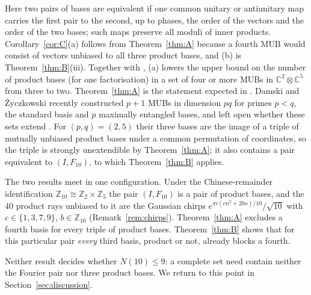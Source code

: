\documentclass[11pt]{article}
\theoremstyle{definition}
\theoremstyle{remark}
\newcommand{\C}{\mathbb{C}}
\newcommand{\Z}{\mathbb{Z}}
\begin{document}
Here two pairs of bases are equivalent if one common unitary or antiunitary map carries the first pair to the second,
up to phases, the order of the vectors and the order of the two bases; such maps preserve all moduli of inner
products. Corollary~\ref{cor:C}(a) follows from Theorem~\ref{thm:A} because a fourth MUB would consist of vectors
unbiased to all three product bases, and (b) is Theorem~\ref{thm:B}(iii). Together with \cite[Thm.~2]{MPW2016}, (a)
lowers the upper bound on the number of product bases (for one factorisation) in a set of four or more MUBs in
$\C^2\otimes\C^5$ from three to two. Theorem~\ref{thm:A} is the statement expected in
\cite[after Cor.~6]{MPW2016}. Damski and \.Zyczkowski recently constructed $p+1$ MUBs in dimension $pq$ for primes
$p<q$, the standard basis and $p$ maximally entangled bases, and left open whether these sets extend
\cite{DamskiZyczkowski2026}. For $(p,q)=(2,5)$ their three bases are the image of a triple of mutually unbiased
product bases under a common permutation of coordinates, so the triple is strongly unextendible by
Theorem~\ref{thm:A}; it also contains a pair equivalent to $(I,F_{10})$, to which Theorem~\ref{thm:B} applies.

The two results meet in one configuration. Under the Chinese-remainder identification $\Z_{10}\cong\Z_2\times\Z_5$ the
pair $(I,F_{10})$ is a pair of product bases, and the $40$ product rays unbiased to it are the Gaussian chirps
$e^{\pi i(cn^2+2bn)/10}/\sqrt{10}$ with $c\in\{1,3,7,9\}$, $b\in\Z_{10}$ (Remark~\ref{rem:chirps}). Theorem~\ref{thm:A} excludes a
fourth basis for every triple of product bases. Theorem~\ref{thm:B} shows that for this particular
pair \emph{every} third basis, product or not, already blocks a fourth.

Neither result decides whether $N(10)\le 9$: a complete set need contain neither the Fourier pair nor three product
bases. We return to this point in Section~\ref{sec:discussion}.
\end{document}
